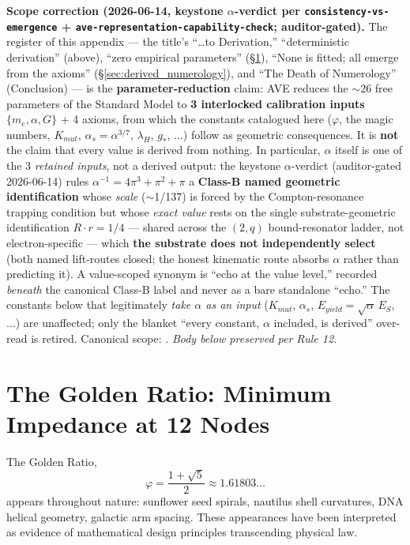 \textbf{Scope correction (2026-06-14, keystone $\alpha$-verdict per \texttt{consistency-vs-emergence} + \texttt{ave-representation-capability-check}; auditor-gated).} The register of this appendix --- the title's ``\ldots to Derivation,'' ``deterministic derivation'' (above), ``zero empirical parameters'' (\S\ref{sec:golden_ratio_emergence}), ``None is fitted; all emerge from the axioms'' (\S\ref{sec:derived_numerology}), and ``The Death of Numerology'' (Conclusion) --- is the \textbf{parameter-reduction} claim: AVE reduces the $\sim$26 free parameters of the Standard Model to \textbf{3 interlocked calibration inputs} $\{m_e, \alpha, G\}$ + 4 axioms, from which the constants catalogued here ($\varphi$, the magic numbers, $K_{mut}$, $\alpha_s = \alpha^{3/7}$, $\lambda_H$, $g_*$, $\ldots$) follow as geometric consequences. It is \textbf{not} the claim that every value is derived from nothing. In particular, $\alpha$ itself is one of the 3 \emph{retained inputs}, not a derived output: the keystone $\alpha$-verdict (auditor-gated 2026-06-14) rules $\alpha^{-1} = 4\pi^3 + \pi^2 + \pi$ a \textbf{Class-B named geometric identification} whose \emph{scale} ($\sim$1/137) is forced by the Compton-resonance trapping condition but whose \emph{exact value} rests on the single substrate-geometric identification $R \cdot r = 1/4$ --- shared across the $(2,q)$ bound-resonator ladder, not electron-specific --- which \textbf{the substrate does not independently select} (both named lift-routes closed; the honest kinematic route absorbs $\alpha$ rather than predicting it). A value-scoped synonym is ``echo at the value level,'' recorded \emph{beneath} the canonical Class-B label and never as a bare standalone ``echo.'' The constants below that legitimately \emph{take $\alpha$ as an input} ($K_{mut}$, $\alpha_s$, $E_{yield} = \sqrt{\alpha}\,E_S$, $\ldots$) are unaffected; only the blanket ``every constant, $\alpha$ included, is derived'' over-read is retired. Canonical scope: . \textit{Body below preserved per Rule 12.}

\section{The Golden Ratio: Minimum Impedance at 12 Nodes}
\label{sec:golden_ratio_emergence}

The Golden Ratio,
\begin{equation}
    \varphi = \frac{1 + \sqrt{5}}{2} \approx 1.61803\ldots
\end{equation}
appears throughout nature: sunflower seed spirals, nautilus shell curvatures, DNA helical geometry, galactic arm spacing. These appearances have been interpreted as evidence of mathematical design principles transcending physical law.

